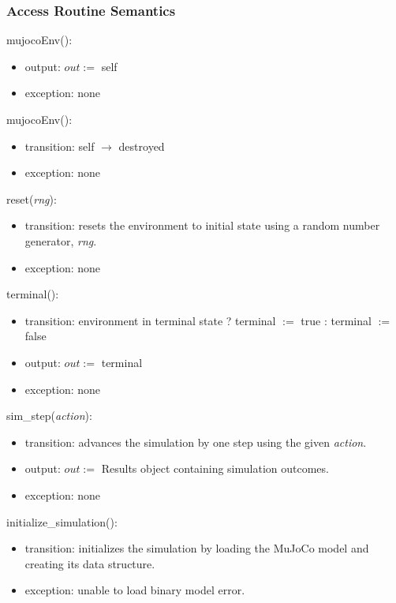 \documentclass[12pt, titlepage]{article}
\begin{document}
\subsubsection{Access Routine Semantics}

\noindent mujocoEnv():
\begin{itemize}
\item output: $out :=$ self
\item exception: none
\end{itemize}

\noindent \texttildelow mujocoEnv():
\begin{itemize}
\item transition: self $\rightarrow$ destroyed
\item exception: none 
\end{itemize}

\noindent reset(\textit{rng}):
\begin{itemize}
\item transition: resets the environment to initial state using a random number generator, \textit{rng}.
\item exception: none
\end{itemize}

\noindent terminal():
\begin{itemize}
\item transition: environment in terminal state ? terminal $:=$ true : terminal $:=$ false
\item output: $out :=$ terminal
\item exception: none
\end{itemize}

\noindent sim\_step(\textit{action}):
\begin{itemize}
\item transition: advances the simulation by one step using the given \textit{action}.
\item output: $out :=$ Results object containing simulation outcomes.
\item exception: none
\end{itemize}

\noindent initialize\_simulation():
\begin{itemize}
\item transition: initializes the simulation by loading the MuJoCo model and creating its data structure.
\item exception: unable to load binary model error.
\end{itemize}
\end{document}

